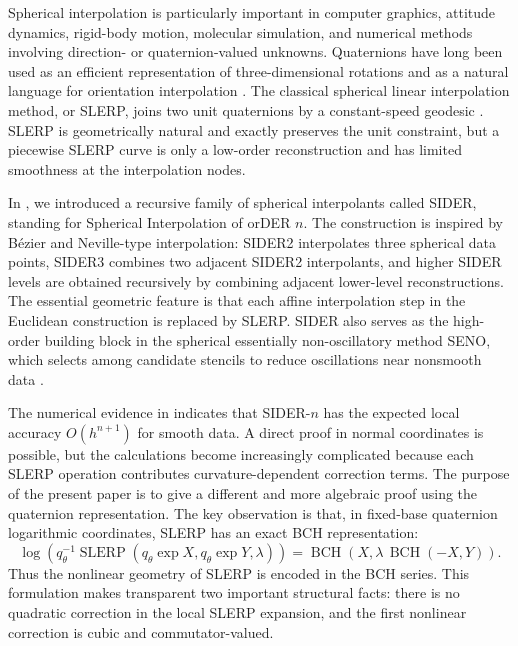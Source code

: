 \documentclass[a4paper,11pt]{article}
\newcommand{\SLERP}{\operatorname{SLERP}}
\newcommand{\BCH}{\operatorname{BCH}}
\numberwithin{equation}{section}
\theoremstyle{plain}
\theoremstyle{definition}
\theoremstyle{remark}
\begin{document}
Spherical interpolation is particularly important in computer graphics,
attitude dynamics, rigid-body motion, molecular simulation, and numerical
methods involving direction- or quaternion-valued unknowns.  Quaternions have
long been used as an efficient representation of three-dimensional rotations
and as a natural language for orientation interpolation
\cite{ham63,kui02,muk02,zha97}.  The classical spherical linear interpolation
method, or SLERP, joins two unit quaternions by a constant-speed geodesic
\cite{sho85}.  SLERP is geometrically natural and exactly preserves the unit
constraint, but a piecewise SLERP curve is only a low-order reconstruction and
has limited smoothness at the interpolation nodes.

In \cite{fonleu23}, we introduced a recursive family of spherical
interpolants called SIDER, standing for Spherical Interpolation of orDER
\(n\).  The construction is inspired by B\'ezier and Neville-type interpolation:
SIDER2 interpolates three spherical data points, SIDER3 combines two adjacent
SIDER2 interpolants, and higher SIDER levels are obtained recursively by
combining adjacent lower-level reconstructions.  The essential geometric
feature is that each affine interpolation step in the Euclidean construction
is replaced by SLERP.  SIDER also serves as the high-order building block in
the spherical essentially non-oscillatory method SENO, which selects among
candidate stencils to reduce oscillations near nonsmooth data
\cite{fonleu23}.

The numerical evidence in \cite{fonleu23} indicates that SIDER-\(n\) has the
expected local accuracy \(O(h^{n+1})\) for smooth data.  A direct proof in
normal coordinates is possible, but the calculations become increasingly
complicated because each SLERP operation contributes curvature-dependent
correction terms.  The purpose of the present paper is to give a different and
more algebraic proof using the quaternion representation.  The key observation
is that, in fixed-base quaternion logarithmic coordinates, SLERP has an exact
BCH representation:
\[
        \log\!\left(q_\theta^{-1}
        \SLERP(q_\theta\exp X,q_\theta\exp Y,\lambda)\right)
        =
        \BCH\!\left(X,\lambda\,\BCH(-X,Y)\right).
\]
Thus the nonlinear geometry of SLERP is encoded in the BCH series.  This
formulation makes transparent two important structural facts: there is no
quadratic correction in the local SLERP expansion, and the first nonlinear
correction is cubic and commutator-valued.
\end{document}
